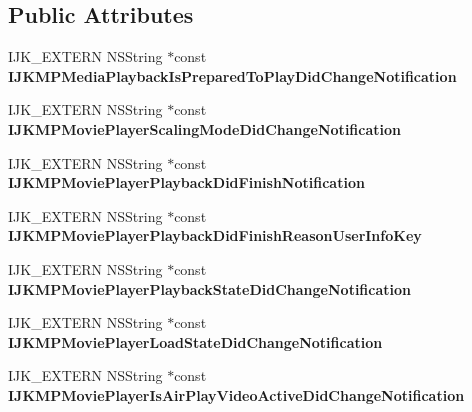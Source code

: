 \subsection*{Public Attributes}
\begin{DoxyCompactItemize}
\item 
\mbox{\label{protocol_i_j_k_media_playback_01-p_a5721c242f9e2de9e35617b982878f41c}} 
I\+J\+K\+\_\+\+E\+X\+T\+E\+RN N\+S\+String $\ast$const {\bfseries I\+J\+K\+M\+P\+Media\+Playback\+Is\+Prepared\+To\+Play\+Did\+Change\+Notification}
\item 
\mbox{\label{protocol_i_j_k_media_playback_01-p_a10fc1ef805fb39c16b51b1abd81d12c8}} 
I\+J\+K\+\_\+\+E\+X\+T\+E\+RN N\+S\+String $\ast$const {\bfseries I\+J\+K\+M\+P\+Movie\+Player\+Scaling\+Mode\+Did\+Change\+Notification}
\item 
\mbox{\label{protocol_i_j_k_media_playback_01-p_ab55aa2dd70bf74e486851972bf5c326a}} 
I\+J\+K\+\_\+\+E\+X\+T\+E\+RN N\+S\+String $\ast$const {\bfseries I\+J\+K\+M\+P\+Movie\+Player\+Playback\+Did\+Finish\+Notification}
\item 
\mbox{\label{protocol_i_j_k_media_playback_01-p_a96f0c97d65c2cfa69bcfda2b4c8f0f4b}} 
I\+J\+K\+\_\+\+E\+X\+T\+E\+RN N\+S\+String $\ast$const {\bfseries I\+J\+K\+M\+P\+Movie\+Player\+Playback\+Did\+Finish\+Reason\+User\+Info\+Key}
\item 
\mbox{\label{protocol_i_j_k_media_playback_01-p_a114cdde557af7aa34c954f38ffe1abe5}} 
I\+J\+K\+\_\+\+E\+X\+T\+E\+RN N\+S\+String $\ast$const {\bfseries I\+J\+K\+M\+P\+Movie\+Player\+Playback\+State\+Did\+Change\+Notification}
\item 
\mbox{\label{protocol_i_j_k_media_playback_01-p_a3fa9869fd6ac033ed8de4c90305ec538}} 
I\+J\+K\+\_\+\+E\+X\+T\+E\+RN N\+S\+String $\ast$const {\bfseries I\+J\+K\+M\+P\+Movie\+Player\+Load\+State\+Did\+Change\+Notification}
\item 
\mbox{\label{protocol_i_j_k_media_playback_01-p_adbb21e80c80f0f8649f0e25a02d1ffbd}} 
I\+J\+K\+\_\+\+E\+X\+T\+E\+RN N\+S\+String $\ast$const {\bfseries I\+J\+K\+M\+P\+Movie\+Player\+Is\+Air\+Play\+Video\+Active\+Did\+Change\+Notification}

\end{DoxyCompactItemize}
